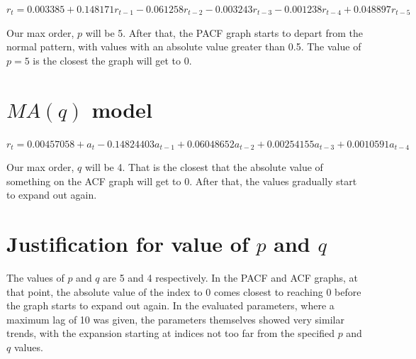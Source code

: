 \documentclass{article}
\begin{document}
\par\noindent\Large $r_{t} = 0.003385 + 0.148171r_{t - 1} - 0.061258r_{t - 2} - 0.003243r_{t - 3} - 0.001238r_{t - 4} + 0.048897r_{t - 5}$

\par\noindent\Large Our max order, $p$ will be 5.  After that, the PACF graph starts to depart from the normal pattern, with values with an absolute value greater than 0.5.  The value of $p = 5$ is the closest the graph will get to 0.
\section{$MA(q)$ model}

\par\noindent\Large $r_{t} = 0.00457058 + a_{t} - 0.14824403a_{t - 1} + 0.06048652a_{t - 2} + 0.00254155a_{t - 3} + 0.0010591a_{t - 4}$

\par\noindent\Large Our max order, $q$ will be 4.  That is the closest that the absolute value of something on the ACF graph will get to 0.  After that, the values gradually start to expand out again.

\section{Justification for value of $p$ and $q$}

\par\noindent\Large The values of $p$ and $q$ are 5 and 4 respectively.  In the PACF and ACF graphs, at that point, the absolute value of the index to 0 comes closest to reaching 0 before the graph starts to expand out again.  In the evaluated parameters, where a maximum lag of 10 was given, the parameters themselves showed very similar trends, with the expansion starting at indices not too far from the specified $p$ and $q$ values.

\par\noindent\Large 
\end{document}
